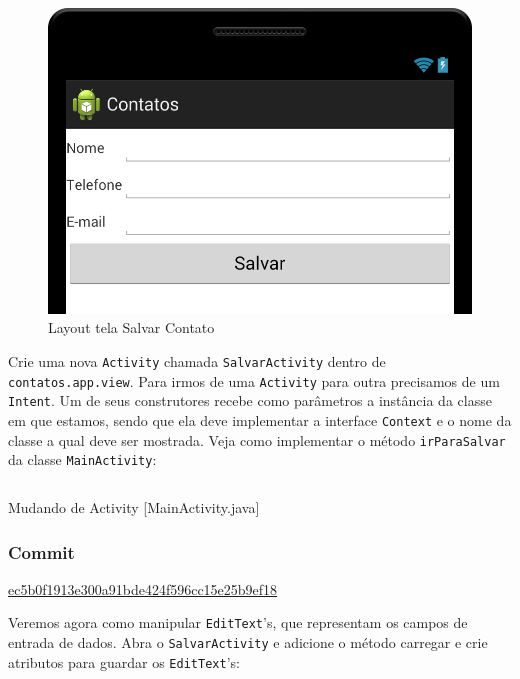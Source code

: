 \begin{figure}[H]
    \center
    \includegraphics[scale=0.3]{img/exemplo-pratico/activity_salvar-1.png}
    \caption{Layout tela Salvar Contato}
\end{figure}

Crie uma nova \texttt{Activity} chamada \texttt{SalvarActivity} dentro
de \texttt{contatos.app.view}. Para irmos de uma \texttt{Activity} para
outra precisamos de um \texttt{Intent}. Um de seus construtores recebe
como parâmetros a instância da classe em que estamos, sendo que ela deve
implementar a interface \texttt{Context} e o nome da classe a qual deve
ser mostrada. Veja como implementar o método \texttt{irParaSalvar} da
classe \texttt{MainActivity}:

\begin{listing}[H]
  \inputminted[linenos=true,frame=bottomline,tabsize=3]{ java }{ source/MainActivity-3.java }
  \caption{Mudando de Activity [MainActivity.java]}
\end{listing}

\subsubsection{Commit}

\href{https://github.com/atilacamurca/guia-aberto-android-contatos/commit/ec5b0f1913e300a91bde424f596cc15e25b9ef18}{ec5b0f1913e300a91bde424f596cc15e25b9ef18}

\medskip

Veremos agora como manipular \texttt{EditText}'s, que representam os
campos de entrada de dados. Abra o \texttt{SalvarActivity} e adicione o
método carregar e crie atributos para guardar os \texttt{EditText}'s:

